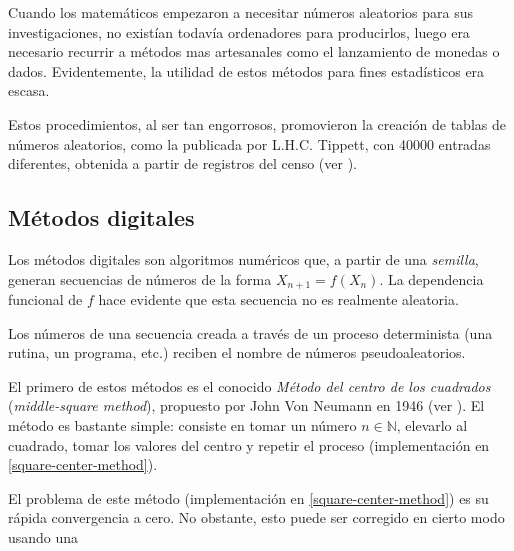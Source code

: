 Cuando los matemáticos empezaron a necesitar números aleatorios para sus investigaciones, no existían todavía ordenadores para producirlos, luego era necesario recurrir a métodos mas artesanales como el lanzamiento de monedas o dados. Evidentemente, la utilidad de estos métodos para fines estadísticos era escasa.

Estos procedimientos, al ser tan engorrosos, promovieron la creación de tablas de números aleatorios, como la publicada por L.H.C. Tippett, con 40000 entradas diferentes, obtenida a partir de registros del censo (ver \cite{Tippett}).

\subsection{Métodos digitales}

Los métodos digitales son algoritmos numéricos que, a partir de una \textit{semilla}, generan secuencias de números de la forma $X_{n+1}=f(X_n)$. La dependencia funcional de $f$ hace evidente que esta secuencia no es realmente aleatoria.

\begin{definition}
Los números de una secuencia creada a través de un proceso determinista (una rutina, un programa, etc.) reciben el nombre de números pseudoaleatorios.
\end{definition}

El primero de estos métodos es el conocido \textit{Método del centro de los cuadrados} (\textit{middle-square method}), propuesto por John Von Neumann en 1946 (ver \cite{von195113}). El método es bastante simple: consiste en tomar un número $n\in\mathbb{N}$, elevarlo al cuadrado, tomar los valores del centro y repetir el proceso (implementación en \ref{square-center-method}). 

El problema de este método (implementación en \ref{square-center-method}) es su rápida convergencia a cero. No obstante, esto puede ser corregido en cierto modo usando una 


